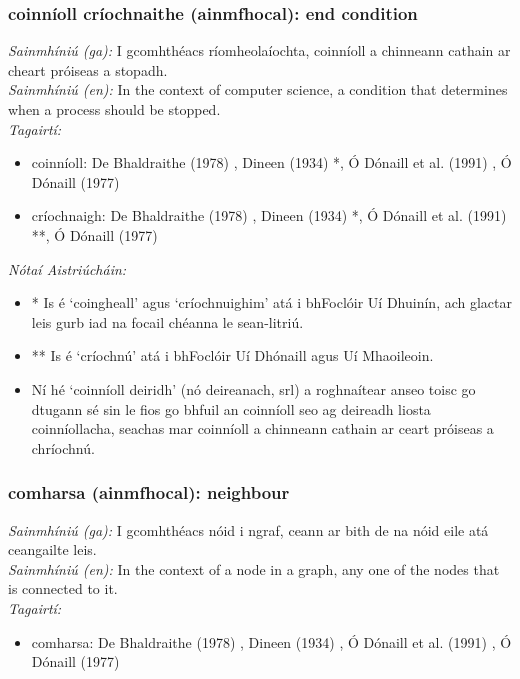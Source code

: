\subsubsection*{coinníoll críochnaithe (ainmfhocal): end condition}
 \noindent \textit{Sainmhíniú (ga):} I gcomhthéacs ríomheolaíochta, coinníoll a chinneann cathain ar cheart próiseas a stopadh.
\\
 \noindent \textit{Sainmhíniú (en):} In the context of computer science, a condition that determines when a process should be stopped.
\\
 \noindent \textit{Tagairtí:}
\begin{itemize}
	\item coinníoll: De Bhaldraithe (1978) \cite{de-bhaldraithe}, Dineen (1934) \cite{dineen}*, Ó Dónaill et al. (1991) \cite{focloir-beag}, Ó Dónaill (1977) \cite{odonaill}
	\item críochnaigh: De Bhaldraithe (1978) \cite{de-bhaldraithe}, Dineen (1934) \cite{dineen}*, Ó Dónaill et al. (1991) \cite{focloir-beag}**, Ó Dónaill (1977) \cite{odonaill}
\end{itemize}

 \noindent \textit{Nótaí Aistriúcháin:}
\begin{itemize}
	\item * Is é `coingheall' agus `críochnuighim' atá i bhFoclóir Uí Dhuinín, ach glactar leis gurb iad na focail chéanna le sean-litriú.
	\item ** Is é `críochnú' atá i bhFoclóir Uí Dhónaill agus Uí Mhaoileoin.
	\item Ní hé `coinníoll deiridh' (nó deireanach, srl) a roghnaítear anseo toisc go dtugann sé sin le fios go bhfuil an coinníoll seo ag deireadh liosta coinníollacha, seachas mar coinníoll a chinneann cathain ar ceart próiseas a chríochnú.
\end{itemize}


\subsubsection*{comharsa (ainmfhocal): neighbour}
 \noindent \textit{Sainmhíniú (ga):} I gcomhthéacs nóid i ngraf, ceann ar bith de na nóid eile atá ceangailte leis.
\\
 \noindent \textit{Sainmhíniú (en):} In the context of a node in a graph, any one of the nodes that is connected to it.
\\
 \noindent \textit{Tagairtí:}
\begin{itemize}
	\item comharsa: De Bhaldraithe (1978) \cite{de-bhaldraithe}, Dineen (1934) \cite{dineen}, Ó Dónaill et al. (1991) \cite{focloir-beag}, Ó Dónaill (1977) \cite{odonaill}
\end{itemize}

